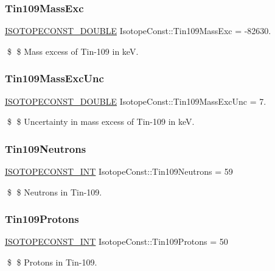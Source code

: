 \subsubsection{\texorpdfstring{Tin109\+Mass\+Exc}{Tin109MassExc}}
{\footnotesize\ttfamily \mbox{\hyperlink{group___isotope_const-_macros_ga8f45a7272ce02c0b4c65c44636ed719a}{I\+S\+O\+T\+O\+P\+E\+C\+O\+N\+S\+T\+\_\+\+D\+O\+U\+B\+LE}} Isotope\+Const\+::\+Tin109\+Mass\+Exc = -\/82630.}

\$ \$ Mass excess of Tin-\/109 in keV. \mbox{\label{group___isotope_const-_tin-_sn109_gad2dc1d9b10984c66dc93a41cc1bbb76b}} 
\subsubsection{\texorpdfstring{Tin109\+Mass\+Exc\+Unc}{Tin109MassExcUnc}}
{\footnotesize\ttfamily \mbox{\hyperlink{group___isotope_const-_macros_ga8f45a7272ce02c0b4c65c44636ed719a}{I\+S\+O\+T\+O\+P\+E\+C\+O\+N\+S\+T\+\_\+\+D\+O\+U\+B\+LE}} Isotope\+Const\+::\+Tin109\+Mass\+Exc\+Unc = 7.}

\$ \$ Uncertainty in mass excess of Tin-\/109 in keV. \mbox{\label{group___isotope_const-_tin-_sn109_ga7764747c35db452205cb5056c771fe4c}} 
\subsubsection{\texorpdfstring{Tin109\+Neutrons}{Tin109Neutrons}}
{\footnotesize\ttfamily \mbox{\hyperlink{group___isotope_const-_macros_ga5f18360b3e99483a35c32d789e62621c}{I\+S\+O\+T\+O\+P\+E\+C\+O\+N\+S\+T\+\_\+\+I\+NT}} Isotope\+Const\+::\+Tin109\+Neutrons = 59}

\$ \$ Neutrons in Tin-\/109. \mbox{\label{group___isotope_const-_tin-_sn109_ga7b313efb4a51c5b96181fbfa3c7d11e7}} 
\subsubsection{\texorpdfstring{Tin109\+Protons}{Tin109Protons}}
{\footnotesize\ttfamily \mbox{\hyperlink{group___isotope_const-_macros_ga5f18360b3e99483a35c32d789e62621c}{I\+S\+O\+T\+O\+P\+E\+C\+O\+N\+S\+T\+\_\+\+I\+NT}} Isotope\+Const\+::\+Tin109\+Protons = 50}

\$ \$ Protons in Tin-\/109. 